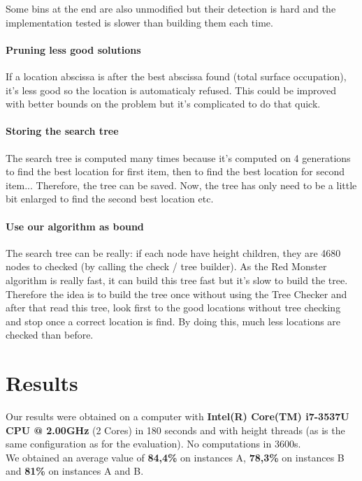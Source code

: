 \documentclass{article}
\begin{document}
Some bins at the end are also unmodified but their detection is hard and the implementation tested is slower than building them each time.

    \paragraph{Pruning less good solutions}
If a location abscissa is after the best abscissa found (total surface occupation), it's less good so the location is automaticaly refused. This could be improved with better bounds on the problem but it's complicated to do that quick.

    \paragraph{Storing the search tree}
The search tree is computed many times because it's computed on 4 generations to find the best location for first item, then to find the best location for second item... Therefore, the tree can be saved. Now, the tree has only need to be a little bit enlarged to find the second best location etc.

    \paragraph{Use our algorithm as bound}
The search tree can be really: if each node have height children,  they are 4680 nodes to checked (by calling the check / tree builder). As the Red Monster algorithm is really fast, it can build this tree fast but it's slow to build the tree. Therefore the idea is to build the tree once without using the Tree Checker and after that read this tree, look first to the good locations without tree checking and stop once a correct location is find. By doing this, much less locations are checked than before.

\section{Results}

Our results were obtained on a computer with \textbf{Intel(R) Core(TM) i7-3537U CPU @ 2.00GHz} (2 Cores) in 180 seconds and with height threads (as is the same configuration as for the evaluation). No computations in 3600s.\\
We obtained an average value of \textbf{84,4\%} on instances A, \textbf{78,3\%} on instances B and \textbf{81\%} on instances A and B.
    
\end{document}
